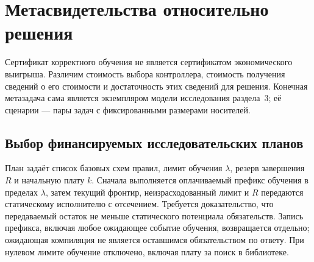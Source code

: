 \section{Метасвидетельства относительно решения}\label{sec:meta-evidence}
Сертификат корректного обучения не является сертификатом экономического выигрыша. Различим стоимость выбора контроллера, стоимость получения сведений о его стоимости и достаточность этих сведений для решения. Конечная метазадача сама является экземпляром модели исследования раздела~3; её сценарии --- пары задач с фиксированными размерами носителей.

\subsection{Выбор финансируемых исследовательских планов}
План задаёт список базовых схем правил, лимит обучения $\lambda$, резерв завершения $R$ и начальную плату $k$. Сначала выполняется оплачиваемый префикс обучения в пределах $\lambda$, затем текущий фронтир, неизрасходованный лимит и $R$ передаются статическому исполнителю с отсечением. Требуется доказательство, что передаваемый остаток не меньше статического потенциала обязательств. Запись префикса, включая любое ожидающее событие обучения, возвращается отдельно; ожидающая компиляция не является оставшимся обязательством по ответу. При нулевом лимите обучение отключено, включая плату за поиск в библиотеке.

